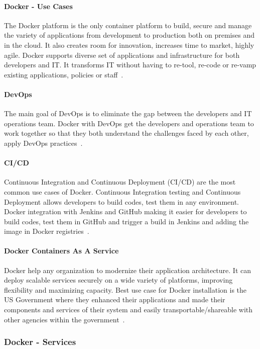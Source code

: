 	\paragraph{Docker - Use Cases}
	The Docker platform is the only container platform to build, 
  secure and manage the variety of applications from development
  to production both on premises and in the cloud. It also creates
  room for innovation, increases time to market, highly agile.
  Docker supports diverse set of applications and infrastructure
  for both developers and IT. It transforms IT without having to
  re-tool, re-code or re-vamp existing applications, policies 
  or staff~\cite{hackernoon}.
  
	\paragraph{DevOps}
	The main goal of DevOps is to eliminate the gap between the
  developers and IT operations team. Docker with DevOps get the
  developers and operations team to work together so that they
  both understand the challenges faced by each other, apply
  DevOps practices~\cite{hackernoon}.
  
	\paragraph{CI/CD}
	Continuous Integration and Continuous Deployment (CI/CD) are
  the most common use cases of Docker. Continuous Integration
  testing and Continuous Deployment allows developers to build
  codes, test them in any environment. Docker integration with 
  Jenkins and GitHub making it easier for developers to build 
  codes, test them in GitHub and trigger a build in Jenkins 
  and adding the image in Docker registries~\cite{hackernoon}.
  
	\paragraph{Docker Containers As A Service}
	Docker help any organization to  modernize their application 
  architecture. It can deploy scalable services securely on a wide 
  variety of platforms, improving flexibility and maximizing capacity. 
  Best use case for Docker installation is the US Government where 
  they enhanced their applications and made their components and
  services of their system and easily transportable/shareable with 
  other agencies within the government~\cite{hackernoon}.
	
	\subsubsection{Docker - Services}
